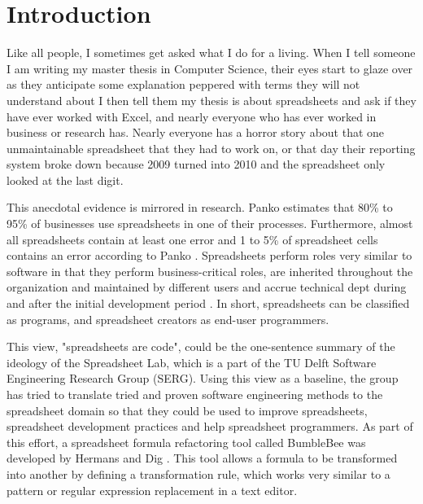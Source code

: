 \documentclass[12pt,a4paper,onecolumn,oneside,parskip]{memoir}
\begin{document}


\cleardoublepage

\tableofcontents*

\clearpage


\chapter{Introduction}

Like all people, I sometimes get asked what I do for a living.
When I tell someone I am writing my master thesis in Computer Science, their eyes start to glaze over as they anticipate some explanation peppered with terms they will not understand about 
I then tell them my thesis is about spreadsheets and ask if they have ever worked with Excel, and nearly everyone who has ever worked in business or research has.
Nearly everyone has a horror story about that one unmaintainable spreadsheet that they had to work on, or that day their reporting system broke down because 2009 turned into 2010 and the spreadsheet only looked at the last digit.

This anecdotal evidence is mirrored in research.
Panko \cite{panko2006facing} estimates that 80\% to 95\% of businesses use spreadsheets in one of their processes.
Furthermore, almost all spreadsheets contain at least one error and 1 to 5\% of spreadsheet cells contains an error according to Panko \cite{panko1998we}.
Spreadsheets perform roles very similar to software in that they perform business-critical roles, are inherited throughout the organization and maintained by different users and accrue technical dept during and after the initial development period \cite{panko1998we}.
In short, spreadsheets can be classified as programs, and spreadsheet creators as end-user programmers.

This view, "spreadsheets are code", could be the one-sentence summary of the ideology of the Spreadsheet Lab, which is a part of the TU Delft Software Engineering Research Group (SERG).
Using this view as a baseline, the group has tried to translate tried and proven software engineering methods to the spreadsheet domain so that they could be used to improve spreadsheets, spreadsheet development practices and help spreadsheet programmers.
As part of this effort, a spreadsheet formula refactoring tool called BumbleBee was developed by Hermans and Dig \cite{hermans2014bumblebee}.
This tool allows a formula to be transformed into another by defining a transformation rule, which works very similar to a pattern or regular expression replacement in a text editor.
\end{document}
